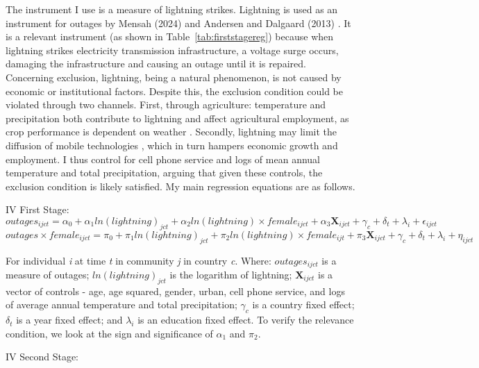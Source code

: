 \documentclass[12pt]{article}
\begin{document}
\par	
The instrument I use is a measure of lightning strikes. Lightning is used as an instrument for outages by Mensah (2024) \cite{mensah2024a} and Andersen and Dalgaard (2013) \cite{andersen2013a}. It is a relevant instrument (as shown in Table~\ref{tab:firststagereg}) because when lightning strikes electricity transmission infrastructure, a voltage surge occurs, damaging the infrastructure and causing an outage until it is repaired. Concerning exclusion, lightning, being a natural phenomenon, is not caused by economic or institutional factors. Despite this, the exclusion condition could be violated through two channels. First, through agriculture: temperature and precipitation both contribute to lightning and affect agricultural employment, as crop performance is dependent on weather \cite{taraz2021a}. Secondly, lightning may limit the diffusion of mobile technologies \cite{manacorda2020a}, which in turn hampers economic growth and employment. I thus control for cell phone service and logs of mean annual temperature and total precipitation, arguing that given these controls, the exclusion condition is likely satisfied. My main regression equations are as follows.
\par
\noindent IV First Stage:
\begin{equation}
outages_{ijct} = \alpha_0 + \alpha_1 ln(lightning)_{jct} + \alpha_2 ln(lightning) \times female_{ijct} + \alpha_3 \textbf{X}_{ijct} + \gamma_{c} + \delta_{t} + \lambda_{i} + \epsilon_{ijct}
\end{equation}
\begin{equation}
outages \times female_{ijct} = \pi_0 + \pi_1 ln(lightning)_{jct} + \pi_2 ln(lightning) \times female_{ijt} + \pi_3 \textbf{X}_{ijct} + \gamma_{c} + \delta_{t} + \lambda_{i} + \eta_{ijct}
\end{equation}
\par
\noindent For individual \textit{i} at time \textit{t} in community \textit{j} in country \textit{c}. Where: $outages_{ijct}$ is a measure of outages; $ln(lightning)_{jct}$ is the logarithm of lightning; $\textbf{X}_{ijct}$ is a vector of controls - age, age squared, gender, urban, cell phone service, and logs of average annual temperature and total precipitation; $\gamma_c$ is a country fixed effect; $\delta_t$ is a year fixed effect; and $\lambda_{i}$ is an education fixed effect. To verify the relevance condition, we look at the sign and significance of $\alpha_1$ and $\pi_2$.
\par
\noindent IV Second Stage:
\end{document}
